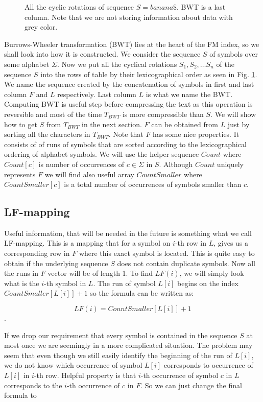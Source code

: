 \begin{figure}
{	}
	\caption[TODO]{All the cyclic rotations of sequence $S = banana\$$. BWT is a last column. Note that we are not storing information about data with grey color.}
	\label{obr:BWT}
\end{figure}

Burrows-Wheeler transformation (BWT) lies at the heart of the FM index, so we shall
look into how it is constructed. We consider the sequence $S$ of symbols over
some alphabet $\Sigma$. Now we put all the cyclical rotations $S_1, S_2, \ldots S_n$ of the
sequence $S$ into the rows of table by their lexicographical order as seen in Fig. \ref{obr:BWT}.
We name the sequence
created by the concatenation of symbols in first and last column $F$ and $L$ respectively.
Last column $L$ is what we name the BWT. Computing BWT is useful step before compressing
the text as this operation is reversible and most of the time $T_{BWT}$ is more compressible
than $S$. We will show how to get $S$ from $T_{BWT}$ in the next section. $F$ can be obtained
from $L$ just by sorting all the characters in $T_{BWT}$. Note that $F$ has some nice properties.
It consists of of runs of symbols that are sorted according to the lexicographical
ordering of alphabet symbols. We will use the helper sequence $Count$ where $Count[c]$ is
number of occurrences of $c\in\Sigma$ in $S$. Although $Count$ uniquely represents $F$ we will
find also useful array $CountSmaller$ where $CountSmaller[c]$ is a total number of occurrences
of symbols smaller than $c$.

\subsection{LF-mapping}

Useful information, that will be needed in the future is something what we call LF-mapping.
This is a mapping that for a symbol on $i$-th row in $L$, gives us a corresponding row in $F$
where this exact symbol is located. This is quite easy to obtain if the underlying sequence $S$
does not contain duplicate symbols. Now all the runs in $F$ vector will be of length 1.
To find $LF(i)$, we will simply look what is the $i$-th symbol in $L$. The run of
symbol $L[i]$ begins on the index $CountSmaller[L[i]] + 1$ so the formula can be written as:

$$LF(i) = CountSmaller[L[i]] + 1$$.

If we drop our requirement that every symbol is contained in the sequence $S$ at most once
we are seemingly in a more complicated situation. The problem may seem that even
though we still easily identify the beginning of the run of $L[i]$, we do not
know which occurrence of symbol $L[i]$ corresponds to occurrence of $L[i]$ in $i$-th row.
Helpful property is that $i$-th occurrence of symbol $c$ in $L$ corresponds to the
$i$-th occurrence of $c$ in $F$. So we can just change the final formula to

